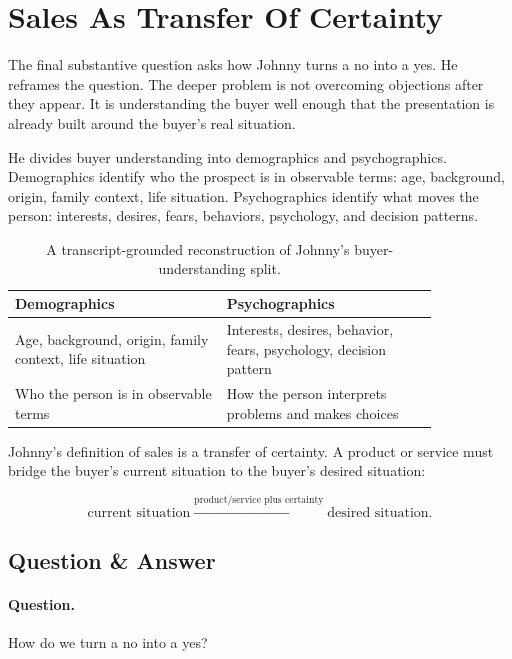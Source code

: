 \section{Sales As Transfer Of Certainty}

The final substantive question asks how Johnny turns a no into a yes. He reframes the question. The deeper problem is not overcoming objections after they appear. It is understanding the buyer well enough that the presentation is already built around the buyer's real situation.

He divides buyer understanding into demographics and psychographics. Demographics identify who the prospect is in observable terms: age, background, origin, family context, life situation. Psychographics identify what moves the person: interests, desires, fears, behaviors, psychology, and decision patterns.

\begin{table}
\centering
\begin{tabular}{|p{0.42\linewidth}|p{0.42\linewidth}|}
\hline
\textbf{Demographics} & \textbf{Psychographics} \\
\hline
Age, background, origin, family context, life situation & Interests, desires, behavior, fears, psychology, decision pattern \\
\hline
Who the person is in observable terms & How the person interprets problems and makes choices \\
\hline
\end{tabular}
\caption{A transcript-grounded reconstruction of Johnny's buyer-understanding split.}
\end{table}

Johnny's definition of sales is a transfer of certainty. A product or service must bridge the buyer's current situation to the buyer's desired situation:

\begin{equation}
\text{current situation}
\xrightarrow{\text{product/service plus certainty}}
\text{desired situation}.
\end{equation}

\subsection{Question \& Answer}

\paragraph{Question.}
How do we turn a no into a yes?

